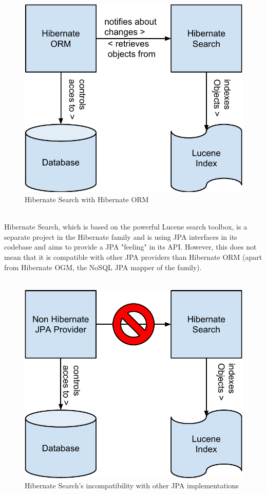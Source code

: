 \begin{figure}[ht]
	\centering
	\includegraphics[scale=0.5]{images/hibernate_search_hibernate_schema.pdf}
		\caption{Hibernate Search with Hibernate ORM}
		\label{fig1}
\end{figure}
\\
Hibernate Search, which is based on the powerful Lucene search toolbox, is a separate project in the Hibernate family and is using JPA interfaces in its codebase and aims to provide a JPA "feeling" in its API. However, this does not mean that it is compatible with other JPA providers than Hibernate ORM (apart from Hibernate OGM, the NoSQL JPA mapper of the family).
\\\\
\begin{figure}[ht]
	\centering
	\includegraphics[scale=0.5]{images/hibernate_search_any_jpa_problem_schema.pdf}
	\caption{Hibernate Search's incompatibility with other JPA implementations}
	\label{fig2}
\end{figure}
